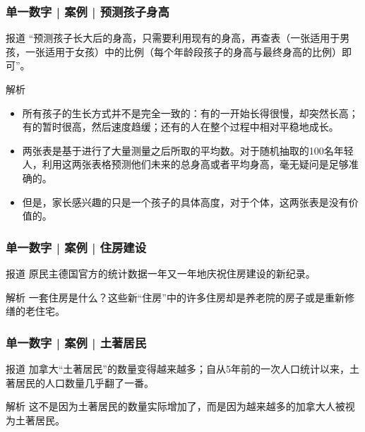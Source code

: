 \begin{frame}
  \frametitle{单一数字 | 案例 | 预测孩子身高}
  \begin{block}{报道}
    “预测孩子长大后的身高，只需要利用现有的身高，再查表（一张适用于男孩，一张适用于女孩）中的比例（每个年龄段孩子的身高与最终身高的比例）即可”。
  \end{block}
  \pause \pause \pause \pause
  \begin{block}{解析}
    \begin{itemize}
      \item 所有孩子的生长方式并不是完全一致的：有的一开始长得很慢，却突然长高；有的暂时很高，然后速度趋缓；还有的人在整个过程中相对平稳地成长。
      \item 两张表是基于进行了大量测量之后所取的平均数。对于随机抽取的100名年轻人，利用这两张表格预测他们未来的总身高或者平均身高，毫无疑问是足够准确的。
      \item 但是，家长感兴趣的只是一个孩子的具体高度，对于个体，这两张表是没有价值的。
    \end{itemize}
  \end{block}
\end{frame}

\begin{frame}
  \frametitle{单一数字 | 案例 | 住房建设}
  \begin{block}{报道}
    原民主德国官方的统计数据一年又一年地庆祝住房建设的新纪录。
  \end{block}
  \pause \pause \pause \pause
  \begin{block}{解析}
    一套住房是什么？这些新“住房”中的许多住房却是养老院的房子或是重新修缮的老住宅。
  \end{block}
\end{frame}

\begin{frame}
  \frametitle{单一数字 | 案例 | 土著居民}
  \begin{block}{报道}
    加拿大“土著居民”的数量变得越来越多；自从5年前的一次人口统计以来，土著居民的人口数量几乎翻了一番。
  \end{block}
  \pause \pause \pause \pause
  \begin{block}{解析}
    这不是因为土著居民的数量实际增加了，而是因为越来越多的加拿大人被视为土著居民。
  \end{block}
\end{frame}


